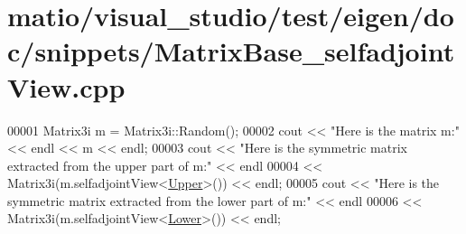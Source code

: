 \hypertarget{matio_2visual__studio_2test_2eigen_2doc_2snippets_2_matrix_base__selfadjoint_view_8cpp_source}{}\section{matio/visual\+\_\+studio/test/eigen/doc/snippets/\+Matrix\+Base\+\_\+selfadjoint\+View.cpp}
\label{matio_2visual__studio_2test_2eigen_2doc_2snippets_2_matrix_base__selfadjoint_view_8cpp_source}

\begin{DoxyCode}
00001 Matrix3i m = Matrix3i::Random();
00002 cout << \textcolor{stringliteral}{"Here is the matrix m:"} << endl << m << endl;
00003 cout << \textcolor{stringliteral}{"Here is the symmetric matrix extracted from the upper part of m:"} << endl
00004      << Matrix3i(m.selfadjointView<\hyperlink{group__enums_gga39e3366ff5554d731e7dc8bb642f83cda6bcb58be3b8b8ec84859ce0c5ac0aaec}{Upper}>()) << endl;
00005 cout << \textcolor{stringliteral}{"Here is the symmetric matrix extracted from the lower part of m:"} << endl
00006      << Matrix3i(m.selfadjointView<\hyperlink{group__enums_gga39e3366ff5554d731e7dc8bb642f83cda891792b8ed394f7607ab16dd716f60e6}{Lower}>()) << endl;
\end{DoxyCode}
